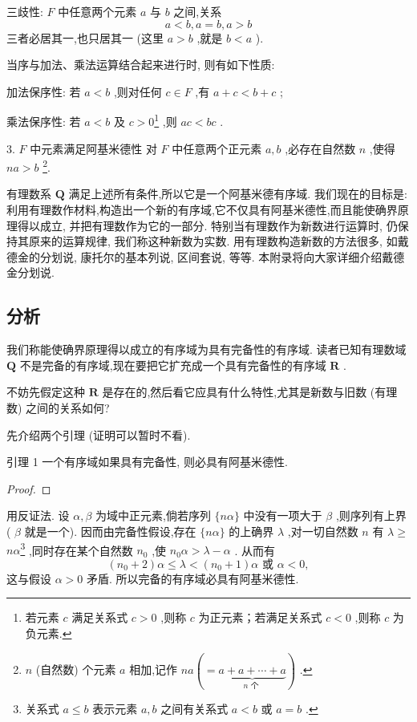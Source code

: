 三歧性: \(F\) 中任意两个元素 \(a\) 与 \(b\) 之间,关系
\[
a < b,a = b,a > b
\]
三者必居其一,也只居其一 (这里 \(a > b\) ,就是 \(b < a\) ).

当序与加法、乘法运算结合起来进行时, 则有如下性质:

加法保序性: 若 \(a < b\) ,则对任何 \(c \in  F\) ,有 \(a + c < b + c\) ;



乘法保序性: 若 \(a < b\) 及 \(c > 0\)\footnote{若元素 \(c\) 满足关系式 \(c > 0\) ,则称 \(c\) 为正元素；若满足关系式 \(c < 0\) ,则称 \(c\) 为负元素.} ,则 \({ac} < {bc}\) .

3. \(F\) 中元素满足阿基米德性 对 \(F\) 中任意两个正元素 \(a,b\) ,必存在自然数 \(n\) ,使得 \({na} > {b}\) \footnote{ \(n\) (自然数) 个元素 \(a\) 相加,记作 \({na}\left( { = \underset{n\text{ 个 }}{\underbrace{a + a + \cdots  + a}}}\right)\) .}.

有理数系 \(\mathbf{Q}\) 满足上述所有条件,所以它是一个阿基米德有序域. 我们现在的目标是:利用有理数作材料,构造出一个新的有序域,它不仅具有阿基米德性,而且能使确界原理得以成立, 并把有理数作为它的一部分. 特别当有理数作为新数进行运算时, 仍保持其原来的运算规律, 我们称这种新数为实数. 用有理数构造新数的方法很多, 如戴德金的分划说, 康托尔的基本列说, 区间套说, 等等. 本附录将向大家详细介绍戴德金分划说.

\subsection{分析}

我们称能使确界原理得以成立的有序域为具有完备性的有序域. 读者已知有理数域 \(\mathbf{Q}\) 不是完备的有序域,现在要把它扩充成一个具有完备性的有序域 \(\mathbf{R}\) .

不妨先假定这种 \(\mathbf{R}\) 是存在的,然后看它应具有什么特性,尤其是新数与旧数 (有理数) 之间的关系如何?

先介绍两个引理 (证明可以暂时不看).

引理 1 一个有序域如果具有完备性, 则必具有阿基米德性.

\begin{proof}

\end{proof}
用反证法. 设 \(\alpha ,\beta\) 为域中正元素,倘若序列 \(\{ {n\alpha }\}\) 中没有一项大于 \(\beta\) ,则序列有上界 ( \(\beta\) 就是一个). 因而由完备性假设,存在 \(\{ {n\alpha }\}\) 的上确界 \(\lambda\) ,对一切自然数 \(n\) 有 \(\lambda  \geq\)  \(n{\alpha }\)\footnote{关系式 \(a \leq  b\) 表示元素 \(a,b\) 之间有关系式 \(a < b\) 或 \(a = b\) .} ,同时存在某个自然数 \({n}_{0}\) ,使 \({n}_{0}\alpha  > \lambda  - \alpha\) . 从而有
\[
\left( {{n}_{0} + 2}\right) \alpha  \leq  \lambda  < \left( {{n}_{0} + 1}\right) \alpha \text{ 或 }\alpha  < 0,
\]
这与假设 \(\alpha  > 0\) 矛盾. 所以完备的有序域必具有阿基米德性.

